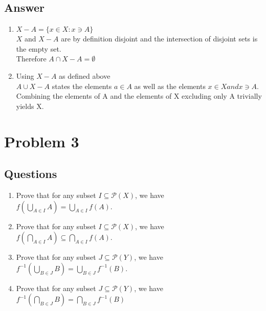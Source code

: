 \documentclass{article}
\begin{document}
\subsection*{Answer}
\begin{enumerate}[label=\alph*]
\item \(X - A = \{ x \in X : x \ni A \}\) \\ \(X\) and \(X - A\) are by definition disjoint and the intersection of disjoint sets is the empty set. \\ Therefore \(A \cap X-A = \emptyset\)
\item Using \(X - A\) as defined above \\ \(A \cup X-A\) states the elements \(a \in A\) as well as the elements \(x \in X and x \ni A\). Combining the elements of A and the elements of X excluding only A trivially yields X. 
\end{enumerate}
\section*{Problem 3}
\subsection*{Questions}
\begin{enumerate}[label=\alph*]
\item Prove that for any subset \(I \subseteq \mathscr{P}(X)\), we have
\\ \hspace*{2cm} \(f(\bigcup\limits_{A \in I}A) = \bigcup\limits_{A \in I}f(A)\).
\item Prove that for any subset \(I \subseteq \mathscr{P}(X)\), we have
\\ \hspace*{2cm} \(f(\bigcap\limits_{A \in I}A) \subseteq \bigcap\limits_{A \in I}f(A)\).
\item Prove that for any subset \(J \subseteq \mathscr{P}(Y)\), we have
\\ \hspace*{2cm} \(f^{-1}(\bigcup\limits_{B \in J}B) = \bigcup\limits_{B \in J}f^{-1}(B).\)	
\item Prove that for any subset \(J \subseteq \mathscr {P}(Y)\), we have
\\ \hspace*{2cm} \(f^{-1}(\bigcap\limits_{B \in J}B) = \bigcap\limits_{B \in J}f^{-1}(B)\)
\end{enumerate}
\end{document}
